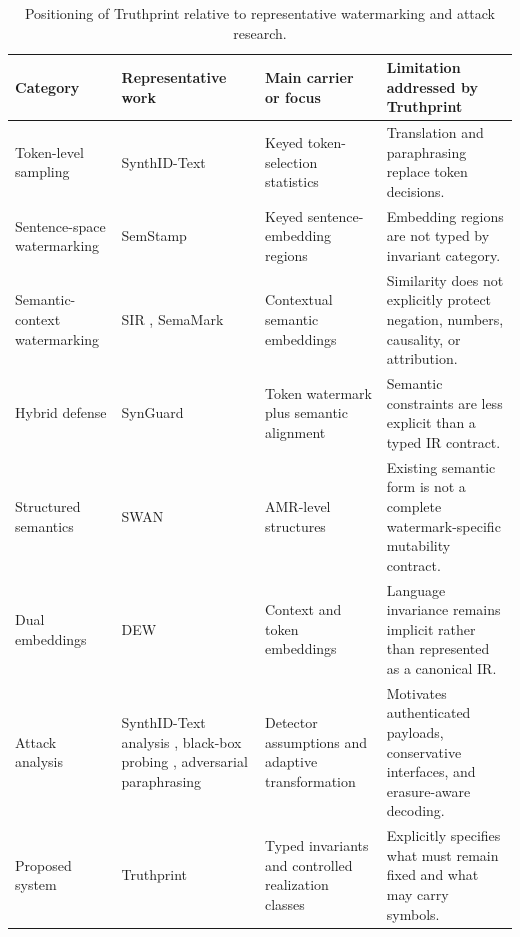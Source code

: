 \documentclass[journal]{IEEEtran}
\begin{document}
\begin{table}[t]
\centering
\caption{Positioning of Truthprint relative to representative watermarking and attack research.}
\label{tab:positioning}
\begin{tabularx}{\textwidth}{@{}>{\raggedright\arraybackslash}p{2.5cm}>{\raggedright\arraybackslash}p{2.9cm}>{\raggedright\arraybackslash}p{3.0cm}X@{}}
\toprule
Category & Representative work & Main carrier or focus & Limitation addressed by Truthprint \\
\midrule
Token-level sampling & SynthID-Text \cite{dathathri2024synthid} & Keyed token-selection statistics & Translation and paraphrasing replace token decisions. \\
Sentence-space watermarking & SemStamp \cite{hou2024semstamp} & Keyed sentence-embedding regions & Embedding regions are not typed by invariant category. \\
Semantic-context watermarking & SIR \cite{liu2023sir}, SemaMark \cite{ren2024semmark} & Contextual semantic embeddings & Similarity does not explicitly protect negation, numbers, causality, or attribution. \\
Hybrid defense & SynGuard \cite{han2025synguard} & Token watermark plus semantic alignment & Semantic constraints are less explicit than a typed IR contract. \\
Structured semantics & SWAN \cite{ye2026swan} & AMR-level structures & Existing semantic form is not a complete watermark-specific mutability contract. \\
Dual embeddings & DEW \cite{schaefer2026dew} & Context and token embeddings & Language invariance remains implicit rather than represented as a canonical IR. \\
Attack analysis & SynthID-Text analysis \cite{omidi2026synthidanalysis}, black-box probing \cite{gloaguen2024blackbox}, adversarial paraphrasing \cite{cheng2025adversarial} & Detector assumptions and adaptive transformation & Motivates authenticated payloads, conservative interfaces, and erasure-aware decoding. \\
Proposed system & Truthprint & Typed invariants and controlled realization classes & Explicitly specifies what must remain fixed and what may carry symbols. \\
\bottomrule
\end{tabularx}
\end{table}
\end{document}

